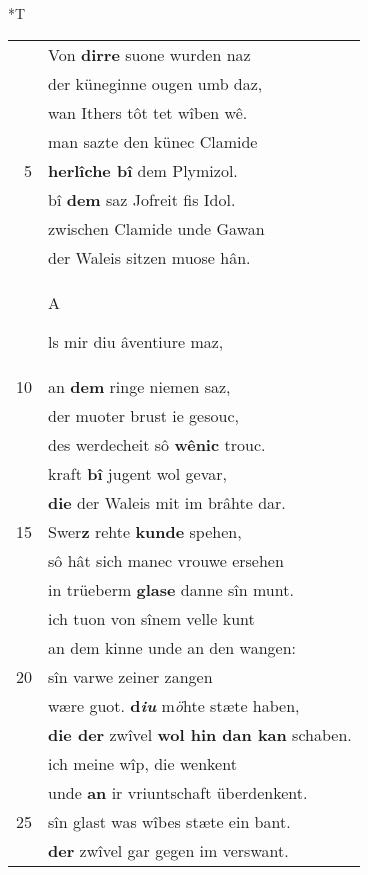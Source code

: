\documentclass[8pt,a4paper,notitlepage]{article}
\begin{document}
\begin{table}[ht]
\begin{minipage}[t]{0.5\linewidth}
\end{minipage}
\hspace{0.5cm}
\begin{minipage}[t]{0.5\linewidth}
\small
\begin{center}*T
\end{center}
\begin{tabular}{rl}
 & Von \textbf{dirre} suone wurden naz\\ 
 & der küneginne ougen umb daz,\\ 
 & wan Ithers tôt tet wîben wê.\\ 
 & man sazte den künec Clamide\\ 
5 & \textbf{herlîche bî} dem Plymizol.\\ 
 & bî \textbf{dem} saz Jofreit fis Idol.\\ 
 & zwischen Clamide unde Gawan\\ 
 & der Waleis sitzen muose hân.\\ 
 & \begin{large}A\end{large}ls mir diu âventiure maz,\\ 
10 & an \textbf{dem} ringe niemen saz,\\ 
 & der muoter brust ie gesouc,\\ 
 & des werdecheit sô \textbf{wênic} trouc.\\ 
 & kraft \textbf{bî} jugent wol gevar,\\ 
 & \textbf{die} der Waleis mit im brâhte dar.\\ 
15 & Swer\textbf{z} rehte \textbf{kunde} spehen,\\ 
 & sô hât sich manec vrouwe ersehen\\ 
 & in trüeberm \textbf{glase} danne sîn munt.\\ 
 & ich tuon von sînem velle kunt\\ 
 & an dem kinne unde an den wangen:\\ 
20 & sîn varwe zeiner zangen\\ 
 & wære guot. \textbf{d\textit{iu}} m\textit{ö}hte stæte haben,\\ 
 & \textbf{die der} zwîvel \textbf{wol hin dan kan} schaben.\\ 
 & ich meine wîp, die wenkent\\ 
 & unde \textbf{an} ir vriuntschaft überdenkent.\\ 
25 & sîn glast was wîbes stæte ein bant.\\ 
 & \textbf{der} zwîvel gar gegen im verswant.\\ 

\end{tabular}
\end{minipage}
\end{table}
\end{document}
